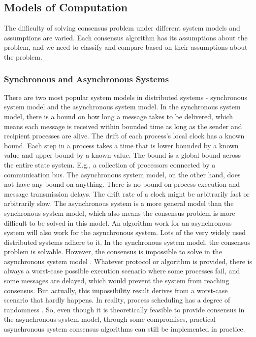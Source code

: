 \documentclass[12pt, a4paper]{article}
\begin{document}

\subsection{Models of Computation}

The difficulty of solving consensus problem under different system models and
assumptions are varied. Each consensus algorithm has its assumptions about the
problem, and we need to classify and compare based on their assumptions about
the problem.

\subsubsection{Synchronous and Asynchronous Systems}

There are two most popular system models in distributed systems - synchronous
system model and the asynchronous system model. In the synchronous system model,
there is a bound on how long a message takes to be delivered, which means each
message is received within bounded time as long as the sender and recipient
processes are alive. The drift of each process's local clock has a known bound.
Each step in a process takes a time that is lower bounded by a known value and
upper bound by a known value. The bound is a global bound across the entire
state system. E.g., a collection of processors connected by a communication bus.
The asynchronous system model, on the other hand, does not have any bound on
anything. There is no bound on process execution and message transmission
delays. The drift rate of a clock might be arbitrarily fast or arbitrarily slow.
The asynchronous system is a more general model than the synchronous system
model, which also means the consensus problem is more difficult to be solved in
this model. An algorithm work for an asynchronous system will also work for the
asynchronous system. Lots of the very widely used distributed systems adhere to
it. In the synchronous system model, the consensus problem is solvable. However,
the consensus is impossible to solve in the asynchronous system model
\cite{fischer1985impossibility}. Whatever protocol or algorithm is provided,
there is always a worst-case possible execution scenario where some processes
fail, and some messages are delayed, which would prevent the system from
reaching consensus. But actually, this impossibility result derives from a
worst-case scenario that hardly happens. In reality, process scheduling has a
degree of randomness \cite{aguilera2010stumbling}. So, even though it is
theoretically feasible to provide consensus in the asynchronous system model,
through some compromises, practical asynchronous system consensus algorithms can
still be implemented in practice.
\end{document}
